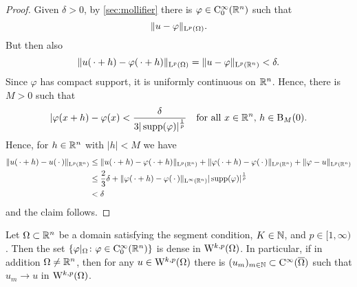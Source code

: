 \begin{proof}
  Given $\delta > 0$, by \ref{sec:mollifier} there is $\varphi \in \mathrm{C}_0^\infty(\mathbb{R}^n)$ such that
  $$
  \|u - \varphi\|_{\mathrm{L}^p(\Omega)}.
  $$
  But then also
  $$
  \|u(\,\cdot + h) - \varphi(\,\cdot + h) \|_{\mathrm{L}^p(\Omega)} = \|u - \varphi\|_{\mathrm{L}^p(\mathbb{R}^n)} < \delta.
  $$
  Since $\varphi$ has compact support, it is uniformly continuous on $\mathbb{R}^n$.
  Hence, there is $M > 0$ such that
  $$
  |\varphi(x + h) - \varphi(x) < \frac{\delta}{3|\operatorname{supp}(\varphi)|^{\frac{1}{p}}} \quad\text{for all } x \in \mathbb{R}^n\text{, } h \in \mathrm{B}_M(0).
  $$
  Hence, for $h \in \mathbb{R}^n$ with $|h| < M$ we have
  \begin{align*}
    \|u(\,\cdot + h) - u(\,\cdot\,)\|_{\mathrm{L}^p(\mathbb{R}^n)}
    &\leq \|u(\,\cdot + h) - \varphi(\,\cdot + h) \|_{\mathrm{L}^p(\mathbb{R}^n)} + \|\varphi(\,\cdot + h) - \varphi(\,\cdot\,) \|_{\mathrm{L}^p(\mathbb{R}^n)} +  \|\varphi - u \|_{\mathrm{L}^p(\mathbb{R}^n)} \\
    &\leq \frac{2}{3}\delta +  \|\varphi(\,\cdot + h) - \varphi(\,\cdot\,)\|_{\mathrm{L}^\infty(\mathbb{R}^n)} |\operatorname{supp}(\varphi)|^{\frac{1}{p}} \\
    &< \delta
  \end{align*}
  and the claim follows.
\end{proof}

\begin{thm}
  \label{thm:CinftyUpToBoundary}
  Let $\Omega \subset \mathbb{R}^n$ be a domain satisfying the segment condition, $K \in \mathbb{N}$, and $p \in [1,\infty)$.
    Then the set 
    $
    \{ \varphi|_\Omega \colon \varphi \in \mathrm{C}_0^\infty(\mathbb{R}^n) \}
    $
    is dense in $\mathrm{W}^{k,p}(\Omega)$.
    In particular, if in addition $\Omega \neq \mathbb{R}^n$, then for any $u \in \mathrm{W}^{k,p}(\Omega)$ there is $(u_m)_{m \in \mathbb{N}} \subset \mathrm{C}^\infty(\overline \Omega)$ such that $u_m \to u$ in $\mathrm{W}^{k,p}(\Omega)$.
\end{thm}

